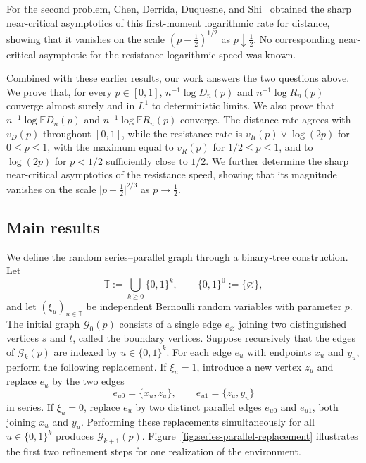\documentclass[a4paper,fleqn]{cas-sc}
\numberwithin{equation}{section}
\theoremstyle{plain}
\theoremstyle{definition}
\newcommand{\E}{\mathbb E}
\begin{document}
For the second problem, Chen, Derrida, Duquesne, and
Shi~\cite[Theorem~1]{ChenDerridaDuquesneShi2026} obtained the sharp
near-critical asymptotics of this first-moment logarithmic rate for distance,
showing that it vanishes on the scale $(p-\frac12)^{1/2}$ as
$p\downarrow\frac12$.  No corresponding
near-critical asymptotic for the resistance logarithmic speed was known.

Combined with these earlier results, our work answers the two
questions above.  We prove that, for every $p\in[0,1]$,
$n^{-1}\log D_n(p)$ and $n^{-1}\log R_n(p)$ converge almost surely and in
$L^1$ to deterministic limits.  We also prove that
$n^{-1}\log\E D_n(p)$ and $n^{-1}\log\E R_n(p)$ converge.  The distance rate
agrees with $v_D(p)$ throughout $[0,1]$, while the resistance rate is
$v_R(p)\vee\log(2p)$ for $0\le p\le1$, with the maximum equal to $v_R(p)$
for $1/2\le p\le1$, and to $\log(2p)$ for $p<1/2$ sufficiently close to
$1/2$.  We further determine the sharp near-critical asymptotics of the
resistance speed, showing that its magnitude vanishes on the scale
$\lvert p-\frac12\rvert^{2/3}$ as $p\to\frac12$.

\subsection{Main results}
\label{sec:main-results}

We define the random series--parallel graph through a binary-tree
construction.  Let
\[
 \mathbb T:=\bigcup_{k\ge0}\{0,1\}^k,
 \qquad \{0,1\}^0:=\{\varnothing\},
\]
and let $(\xi_u)_{u\in\mathbb T}$ be independent Bernoulli random variables
with parameter $p$.  The initial graph $\mathcal G_0(p)$ consists of a
single edge $e_{\varnothing}$ joining two distinguished vertices $s$ and
$t$, called the boundary vertices.  Suppose recursively that the edges of
$\mathcal G_k(p)$ are indexed by $u\in\{0,1\}^k$.  For each edge $e_u$ with
endpoints $x_u$ and $y_u$, perform the following replacement.  If
$\xi_u=1$, introduce a new vertex $z_u$ and replace $e_u$ by the two edges
\[
 e_{u0}=\{x_u,z_u\},
 \qquad
 e_{u1}=\{z_u,y_u\}
\]
in series.  If $\xi_u=0$, replace $e_u$ by two distinct parallel edges
$e_{u0}$ and $e_{u1}$, both joining $x_u$ and $y_u$.  Performing these
replacements simultaneously for all $u\in\{0,1\}^k$ produces
$\mathcal G_{k+1}(p)$.  Figure~\ref{fig:series-parallel-replacement}
illustrates the first two refinement steps for one realization of the
environment.
\end{document}
